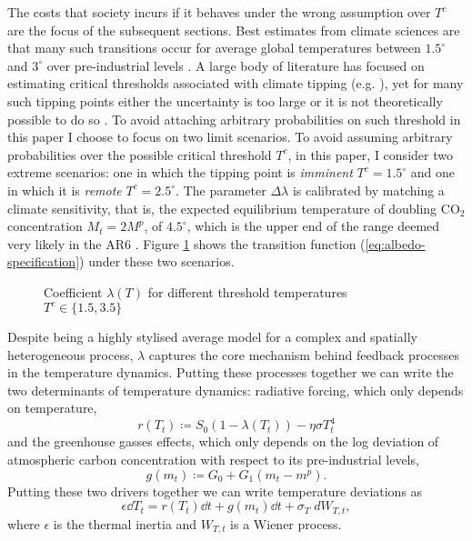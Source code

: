 \documentclass[../../main.tex]{subfiles}
\begin{document}
The costs that society incurs if it behaves under the wrong assumption over $T^c$ are the focus of the subsequent sections. Best estimates from climate sciences are that many such transitions occur for average global temperatures between $1.5^\circ$ and $3^\circ$ over pre-industrial levels \citep{seaver_wang_mechanisms_2023}. A large body of literature has focused on estimating critical thresholds associated with climate tipping (e.g. \citealt{boulton_early_2014,van_westen_physics-based_2024}), yet for many such tipping points either the uncertainty is too large \citep{ben-yami_uncertainties_2024} or it is not theoretically possible to do so \citep{wagener_regime_2013,ditlevsen_tipping_2010}. To avoid attaching arbitrary probabilities on such threshold in this paper I choose to focus on two limit scenarios. To avoid assuming arbitrary probabilities over the possible critical threshold $T^c$, in this paper, I consider two extreme scenarios: one in which the tipping point is \textit{imminent} $T^c = 1.5^\circ$ and one in which it is \textit{remote} $T^c = 2.5^\circ$. The parameter $\Delta\lambda$ is calibrated by matching a climate sensitivity, that is, the expected equilibrium temperature of doubling CO$_2$ concentration $M_t = 2M^p$, of $4.5^\circ$, which is the upper end of the range deemed very likely in the AR6 \cite{lee_ipcc_2023}. Figure \ref{fig:albedo_coefficient} shows the transition function (\ref{eq:albedo-specification}) under these two scenarios. \begin{figure}[htbp]
    \centering
    
    \caption{Coefficient $\lambda(T)$ for different threshold temperatures $T^c \in \{1.5, 3.5\}$}
    \label{fig:albedo_coefficient}
\end{figure} Despite being a highly stylised average model for a complex and spatially heterogeneous process, $\lambda$ captures the core mechanism behind feedback processes in the temperature dynamics. Putting these processes together we can write the two determinants of temperature dynamics: radiative forcing, which only depends on temperature, \begin{equation} \label{eq:forcing}
    r(T_t) \coloneqq S_0 \left(1 - \lambda(T_t)\right) - \eta\sigma T_t^4
\end{equation} and the greenhouse gasses effects, which only depends on the log deviation of atmospheric carbon concentration with respect to its pre-industrial levels, \begin{equation}
    g(m_t) \coloneqq G_0 + G_1 (m_t - m^p).
\end{equation} Putting these two drivers together we can write temperature deviations as \begin{equation} \label{eq:dynamics:temperature}
    \epsilon \dd{T_t} = r(T_t) \dd{t} + g(m_t) \dd{t} + \sigma_T \; dW_{T, t}, 
\end{equation} where $\epsilon$ is the thermal inertia and $W_{T, t}$ is a Wiener process.
\end{document}
